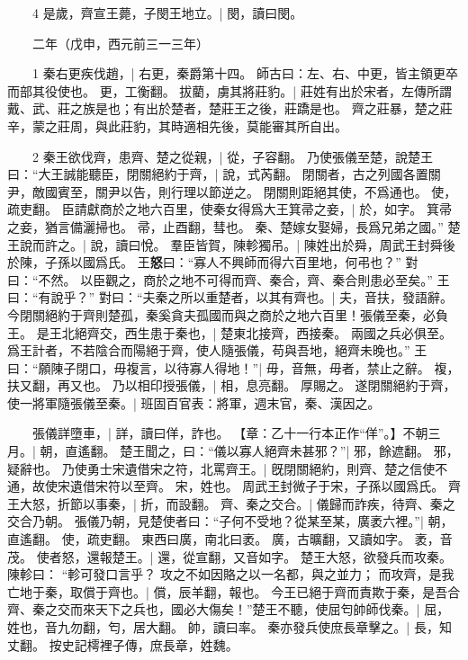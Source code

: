 　　4 是歲，齊宣王薨，子閔王地立。|{
	閔，讀曰閔。
}

　　二年（戊申，西元前三一三年）

　　1 秦右更疾伐趙，|{
	右更，秦爵第十四。
	師古曰：左、右、中更，皆主領更卒而部其役使也。
	更，工衡翻。
}
拔藺，虜其將莊豹。|{
	莊姓有出於宋者，左傳所謂戴、武、莊之族是也；有出於楚者，楚莊王之後，莊蹻是也。
	齊之莊暴，楚之莊辛，蒙之莊周，與此莊豹，其時適相先後，莫能審其所自出。
}

　　2 秦王欲伐齊，患齊、楚之從親，|{
	從，子容翻。
}
乃使張儀至楚，說楚王曰：“大王誠能聽臣，閉關絕約于齊，|{
	說，式芮翻。
	閉關者，古之列國各置關尹，敵國賓至，關尹以告，則行理以節逆之。
	閉關則距絕其使，不爲通也。
	使，疏吏翻。
}
臣請獻商於之地六百里，使秦女得爲大王箕帚之妾，|{
	於，如字。
	箕帚之妾，猶言備灑掃也。
	帚，止酉翻，彗也。
}
秦、楚嫁女娶婦，長爲兄弟之國。”
楚王說而許之。|{
	說，讀曰悅。
}
羣臣皆賀，陳軫獨吊。|{
	陳姓出於舜，周武王封舜後於陳，子孫以國爲氏。
}
王\textbf{\large{怒}}曰：“寡人不興師而得六百里地，何弔也？”
對曰：“不然。
	以臣觀之，商於之地不可得而齊、秦合，齊、秦合則患必至矣。” 
	王曰：“有說乎？”
	對曰：“夫秦之所以重楚者，以其有齊也。|{
	夫，音扶，發語辭。
}
今閉關絕約于齊則楚孤，秦奚貪夫孤國而與之商於之地六百里！張儀至秦，必負王。
	是王北絕齊交，西生患于秦也，|{
	楚東北接齊，西接秦。
}
兩國之兵必俱至。
	爲王計者，不若陰合而陽絕于齊，使人隨張儀，苟與吾地，絕齊未晚也。”
	王曰：“願陳子閉口，毋複言，以待寡人得地！”|{
	毋，音無，毋者，禁止之辭。
	複，扶又翻，再又也。
}
乃以相印授張儀，|{
	相，息亮翻。
}
厚賜之。
遂閉關絕約于齊，使一將軍隨張儀至秦。|{
	班固百官表：將軍，週末官，秦、漢因之。
}

　　張儀詳墮車，|{
	詳，讀曰佯，詐也。
}
【章：乙十一行本正作“佯”。】不朝三月。|{
	朝，直遙翻。
}
楚王聞之，曰：“儀以寡人絕齊未甚邪？”|{
	邪，餘遮翻。
	邪，疑辭也。
}
乃使勇士宋遺借宋之符，北罵齊王。|{
	旣閉關絕約，則齊、楚之信使不通，故使宋遺借宋符以至齊。
	宋，姓也。
	周武王封微子于宋，子孫以國爲氏。
}
齊王大怒，折節以事秦，|{
	折，而設翻。
}
齊、秦之交合。|{
	儀歸而詐疾，待齊、秦之交合乃朝。
}
張儀乃朝，見楚使者曰：“子何不受地？從某至某，廣袤六裡。”|{
	朝，直遙翻。
	使，疏吏翻。
	東西曰廣，南北曰袤。
	廣，古曠翻，又讀如字。
	袤，音茂。
}
使者怒，還報楚王。|{
	還，從宣翻，又音如字。
}
楚王大怒，欲發兵而攻秦。
陳軫曰：
	“軫可發口言乎？
	攻之不如因賂之以一名都，與之並力；
	而攻齊，是我亡地于秦，取償于齊也。|{
	償，辰羊翻，報也。
}
今王已絕于齊而責欺于秦，是吾合齊、秦之交而來天下之兵也，國必大傷矣！”楚王不聽，使屈匄帥師伐秦。|{
	屈，姓也，音九勿翻，匄，居大翻。
	帥，讀曰率。
}
秦亦發兵使庶長章擊之。|{
	長，知丈翻。
	按史記樗裡子傳，庶長章，姓魏。
}


